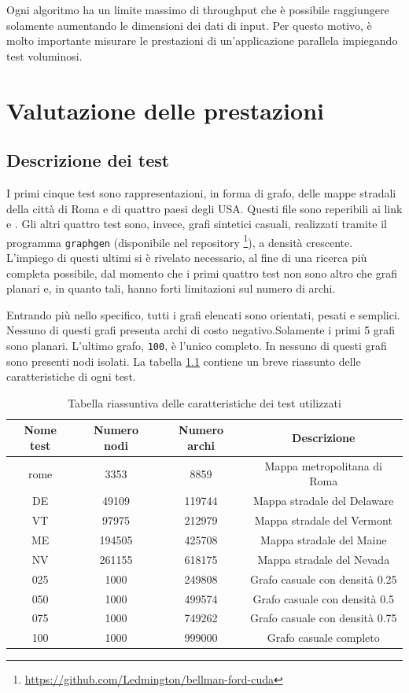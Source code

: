 \documentclass[12pt,a4paper,oneside]{book}
\begin{document}
	Ogni algoritmo ha un limite massimo di throughput che è possibile raggiungere solamente aumentando le dimensioni dei dati di input. Per questo motivo, è molto importante misurare le prestazioni di un'applicazione parallela impiegando test voluminosi.
	
	\chapter{Valutazione delle prestazioni}
	\label{chap:perf}
	\section{Descrizione dei test}
	I primi cinque test sono rappresentazioni, in forma di grafo, delle mappe stradali della città di Roma e di quattro paesi degli USA. Questi file sono reperibili ai link \cite{testUSA} e \cite{testRoma}. Gli altri quattro test sono, invece, grafi sintetici casuali, realizzati tramite il programma \texttt{graphgen} (disponibile nel repository \footnote{\url{https://github.com/Ledmington/bellman-ford-cuda}}), a densità crescente. L'impiego di questi ultimi si è rivelato necessario, al fine di una ricerca più completa possibile, dal momento che i primi quattro test non sono altro che grafi planari e, in quanto tali, hanno forti limitazioni sul numero di archi.
	
	Entrando più nello specifico, tutti i grafi elencati sono orientati, pesati e semplici. Nessuno di questi grafi presenta archi di costo negativo.Solamente i primi 5 grafi sono planari. L'ultimo grafo, \texttt{100}, è l'unico completo. In nessuno di questi grafi sono presenti nodi isolati. La tabella \ref{tab:riassunto_test} contiene un breve riassunto delle caratteristiche di ogni test.
	\begin{table}[!ht]
		\centering
		\begin{tabular}{|c|c|c|c|}
			\hline
			\textbf{Nome test} & \textbf{Numero nodi} & \textbf{Numero archi} & \textbf{Descrizione} \\ \hline
			rome & 3353 & 8859 & Mappa metropolitana di Roma \\ \hline
			DE & 49109 & 119744 & Mappa stradale del Delaware \\ \hline
			VT & 97975 & 212979 & Mappa stradale del Vermont \\ \hline
			ME & 194505 & 425708 & Mappa stradale del Maine \\ \hline
			NV & 261155 & 618175 & Mappa stradale del Nevada \\ \hline
			025 & 1000 & 249808 & Grafo casuale con densità 0.25 \\ \hline
			050 & 1000 & 499574 & Grafo casuale con densità 0.5 \\ \hline
			075 & 1000 & 749262 & Grafo casuale con densità 0.75 \\ \hline
			100 & 1000 & 999000 & Grafo casuale completo \\ \hline
		\end{tabular}
		\caption{Tabella riassuntiva delle caratteristiche dei test utilizzati}
		\label{tab:riassunto_test}
	\end{table}
	
\end{document}
